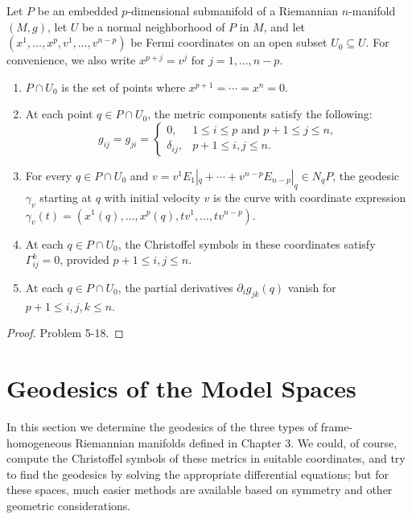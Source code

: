 \begin{proposition}
\label{prop:fermi-coordinates-properties}

Let $P$ be an embedded $p$-dimensional submanifold of a Riemannian $n$-manifold $(M,g)$, let $U$ be a normal neighborhood of $P$ in $M$, and let $(x^1, \ldots, x^p, v^1, \ldots, v^{n-p})$ be Fermi coordinates on an open subset $U_0 \subseteq U$. For convenience, we also write $x^{p+j} = v^j$ for $j = 1, \ldots, n-p$.
\begin{enumerate}
\item[(a)] $P \cap U_0$ is the set of points where $x^{p+1} = \cdots = x^n = 0$.
\item[(b)] At each point $q \in P \cap U_0$, the metric components satisfy the following:
\[
g_{ij} = g_{ji} = \begin{cases} 0, & 1 \le i \le p \text{ and } p+1 \le j \le n, \\ \delta_{ij}, & p+1 \le i, j \le n. \end{cases}
\]
\item[(c)] For every $q \in P \cap U_0$ and $v = v^1 E_1|_q + \cdots + v^{n-p} E_{n-p}|_q \in N_q P$, the geodesic $\gamma_v$ starting at $q$ with initial velocity $v$ is the curve with coordinate expression $\gamma_v(t) = (x^1(q), \ldots, x^p(q), tv^1, \ldots, tv^{n-p})$.
\item[(d)] At each $q \in P \cap U_0$, the Christoffel symbols in these coordinates satisfy $\Gamma^k_{ij} = 0$, provided $p+1 \le i, j \le n$.
\item[(e)] At each $q \in P \cap U_0$, the partial derivatives $\partial_i g_{jk}(q)$ vanish for $p+1 \le i, j, k \le n$.
\end{enumerate}

\begin{proof}
Problem 5-18.
\end{proof}
\end{proposition}

\section{Geodesics of the Model Spaces}

In this section we determine the geodesics of the three types of frame-homogeneous Riemannian manifolds defined in Chapter 3. We could, of course, compute the Christoffel symbols of these metrics in suitable coordinates, and try to find the geodesics by solving the appropriate differential equations; but for these spaces, much easier methods are available based on symmetry and other geometric considerations.

